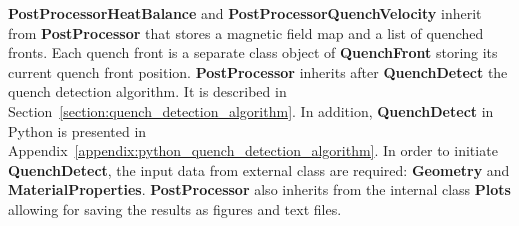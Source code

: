 \textbf{PostProcessorHeatBalance} and \textbf{PostProcessorQuenchVelocity} inherit from \textbf{PostProcessor} that stores a magnetic field map and a list of quenched fronts. Each quench front is a separate class object of \textbf{QuenchFront} storing its current quench front position. \textbf{PostProcessor} inherits after \textbf{QuenchDetect} the quench detection algorithm. It is described in Section~\ref{section:quench_detection_algorithm}. In addition, \textbf{QuenchDetect} in Python is presented in Appendix~\ref{appendix:python_quench_detection_algorithm}. In order to initiate \textbf{QuenchDetect}, the input data from external class are required: \textbf{Geometry} and \textbf{MaterialProperties}. \textbf{PostProcessor} also inherits from the internal class \textbf{Plots} allowing for saving the results as figures and text files.

